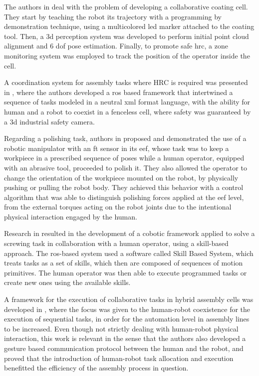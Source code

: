 \par The authors in \cite{colab.cell} deal with the problem of developing a collaborative coating cell. They start by teaching the robot its trajectory with a programming by demonstration technique, using a multicolored \acs{led} marker attached to the coating tool. Then, a \acs{3d} perception system was developed to perform initial point cloud alignment and 6 \ac{dof} pose estimation. Finally, to promote safe \ac{hrc}, a zone monitoring system was employed to track the position of the operator inside the cell.

\par A coordination system for assembly tasks where HRC is required was presented in \cite{colab.assembly}, where the authors developed a \ac{ros} based framework that intertwined a sequence of tasks modeled in a neutral \acs{xml} format language, with the ability for human and a robot to coexist in a fenceless cell, where safety was guaranteed by a \acs{3d} industrial safety camera.

\par Regarding a polishing task, authors in \cite{colab.polishing} proposed and demonstrated the use of a robotic manipulator with an \ac{ft} sensor in its \ac{eef}, whose task was to keep a workpiece in a prescribed sequence of poses while a human operator, equipped with an abrasive tool, proceeded to polish it. They also allowed the operator to change the orientation of the workpiece mounted on the robot, by physically pushing or pulling the robot body. They achieved this behavior with a control algorithm that was able to distinguish polishing forces applied at the \ac{eef} level, from the external torques acting on the robot joints due to the intentional physical interaction engaged by the human.

\par Research in \cite{colab.skill} resulted in the development of a cobotic framework applied to solve a screwing task in collaboration with a human operator, using a skill-based approach. The \ac{ros}-based system used a software called Skill Based System, which treats tasks as a set of skills, which then are composed of sequences of motion primitives. The human operator was then able to execute programmed tasks or create new ones using the available skills.

\par A framework for the execution of collaborative tasks in hybrid assembly cells was developed in \cite{colab.assembly.cell}, where the focus was given to the human-robot coexistence for the execution of sequential tasks, in order for the automation level in assembly lines to be increased. Even though not strictly dealing with human-robot physical interaction, this work is relevant in the sense that the authors also developed a gesture based communication protocol between the human and the robot, and proved that the introduction of human-robot task allocation and execution benefitted the efficiency of the assembly process in question.

